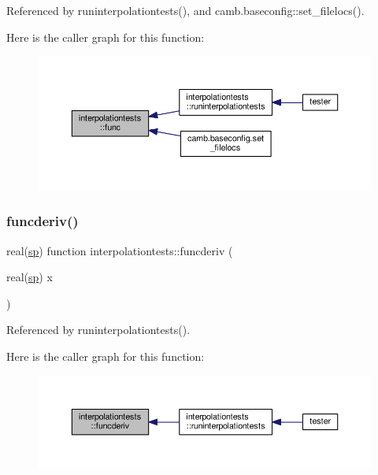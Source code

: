 Referenced by runinterpolationtests(), and camb.\+baseconfig\+::set\+\_\+filelocs().

Here is the caller graph for this function\+:
\nopagebreak
\begin{figure}[H]
\begin{center}
\leavevmode
\includegraphics[width=350pt]{namespaceinterpolationtests_a889784a516823bb7b55caeb7622465a2_icgraph}
\end{center}
\end{figure}
\mbox{\label{namespaceinterpolationtests_a8d9832ae7aac0f3abc5823bfb68e8a85}} 
\subsubsection{\texorpdfstring{funcderiv()}{funcderiv()}}
{\footnotesize\ttfamily real(\mbox{\hyperlink{namespaceinterpolationtests_a4e83007da3730863a762c2e30c3d336f}{sp}}) function interpolationtests\+::funcderiv (\begin{DoxyParamCaption}\item[{real(\mbox{\hyperlink{namespaceinterpolationtests_a4e83007da3730863a762c2e30c3d336f}{sp}})}]{x }\end{DoxyParamCaption})}



Referenced by runinterpolationtests().

Here is the caller graph for this function\+:
\nopagebreak
\begin{figure}[H]
\begin{center}
\leavevmode
\includegraphics[width=350pt]{namespaceinterpolationtests_a8d9832ae7aac0f3abc5823bfb68e8a85_icgraph}
\end{center}
\end{figure}
\mbox{\label{namespaceinterpolationtests_a4884e2815dc1d6e85e77392363e72b83}} 

